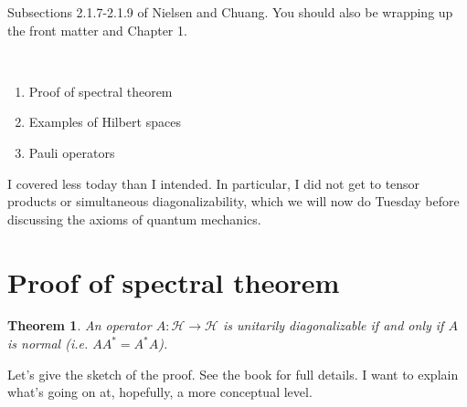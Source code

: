 \documentclass{article}
\newtheorem{thm}{Theorem}
\begin{document}
\noindent
{}

\vspace{.3cm}

 Subsections 2.1.7-2.1.9 of Nielsen and Chuang.  You should also be wrapping up the front matter and Chapter 1.

\

\begin{enumerate}
\item Proof of spectral theorem
\item Examples of Hilbert spaces
\item Pauli operators
\end{enumerate}
I covered less today than I intended.  In particular, I did not get to tensor products or simultaneous diagonalizability, which we will now do Tuesday before discussing the axioms of quantum mechanics.

\section{Proof of spectral theorem}
\begin{thm}
An operator $A:\mathcal{H}\to\mathcal{H}$ is unitarily diagonalizable if and only if $A$ is normal (i.e. $AA^* = A^*A$).
\end{thm}

Let's give the sketch of the proof.  See the book for full details.  I want to explain what's going on at, hopefully, a more conceptual level.
\end{document}
